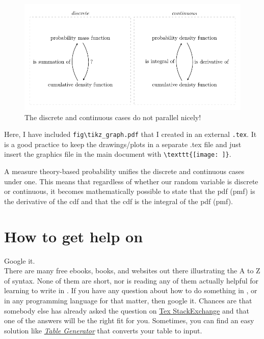 \documentclass[12pt, notitlepage]{article}
\begin{document}
\begin{figure}[h!]
\caption{The discrete  and continuous cases do not parallel nicely!}
\center
\includegraphics{fig/tikz_graph.pdf}
\end{figure}

\begin{notes}
Here, I have included \verb|fig\tikz_graph.pdf| that I created in an external \texttt{.tex}. It is a good practice to keep the drawings/plots in a separate .tex file and just insert the graphics file in the main document with \verb|\texttt{[image: ]}|. 
\end{notes}


A measure theory-based probability unifies the discrete and continuous cases under one. This means that regardless of whether our random variable is discrete or continuous, it becomes mathematically possible to state that the pdf (pmf) is the derivative of the cdf and that the cdf is the integral of the pdf (pmf). 


\section{How to get help on \latex}

{\LARGE Google it.} \\


There are many free ebooks, books, and websites out there illustrating the A to Z of \latex syntax. None of them are short, nor is reading any of them actually helpful for learning to write in \latex. If you have any question about how to do something in \latex, or in any programming language for that matter, then google it. Chances are that somebody else has already asked the question on \href{https://tex.stackexchange.com/}{Tex StackExchange} and that one of the answers will be the right fit for you. Sometimes, you can find an easy solution like \href{https://www.tablesgenerator.com/}{\textit{\latex Table Generator}} that converts your table to \latex input. 
\end{document}
